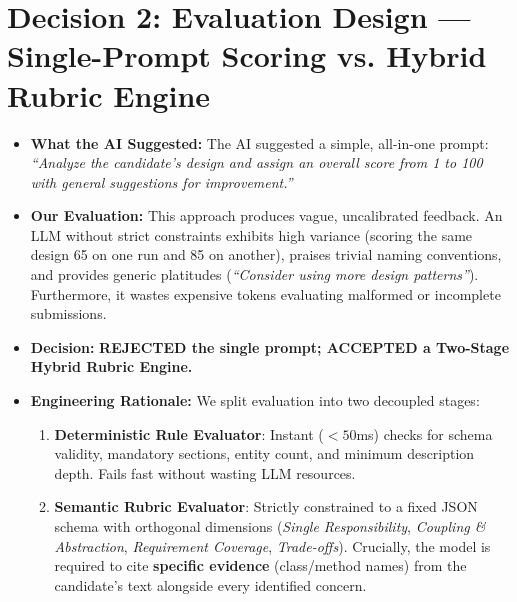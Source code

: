 \documentclass[10pt,a4paper]{article}
\begin{document}
\section*{Decision 2: Evaluation Design --- Single-Prompt Scoring vs. Hybrid Rubric Engine}
\begin{itemize}
  \item \textbf{What the AI Suggested:} The AI suggested a simple, all-in-one prompt: \textit{``Analyze the candidate's design and assign an overall score from 1 to 100 with general suggestions for improvement.''}
  \item \textbf{Our Evaluation:} This approach produces vague, uncalibrated feedback. An LLM without strict constraints exhibits high variance (scoring the same design 65 on one run and 85 on another), praises trivial naming conventions, and provides generic platitudes (\textit{``Consider using more design patterns''}). Furthermore, it wastes expensive tokens evaluating malformed or incomplete submissions.
  \item \textbf{Decision:} \textbf{REJECTED the single prompt; ACCEPTED a Two-Stage Hybrid Rubric Engine.}
  \item \textbf{Engineering Rationale:} We split evaluation into two decoupled stages:
    \begin{enumerate}
      \item \textbf{Deterministic Rule Evaluator}: Instant ($<50$ms) checks for schema validity, mandatory sections, entity count, and minimum description depth. Fails fast without wasting LLM resources.
      \item \textbf{Semantic Rubric Evaluator}: Strictly constrained to a fixed JSON schema with orthogonal dimensions (\textit{Single Responsibility}, \textit{Coupling \& Abstraction}, \textit{Requirement Coverage}, \textit{Trade-offs}). Crucially, the model is required to cite \textbf{specific evidence} (class/method names) from the candidate's text alongside every identified concern.
    \end{enumerate}
\end{itemize}
\end{document}
